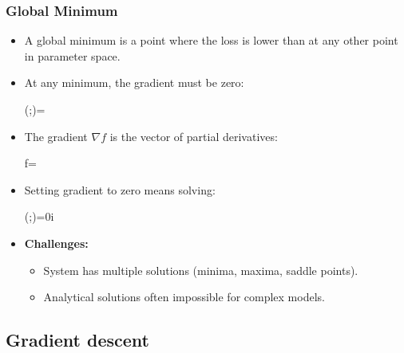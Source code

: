 \subsubsection*{Global Minimum}
\begin{itemize}
    \item A \alert{global minimum} is a point where the loss is lower than at any other point in parameter space.
    \item At any minimum, the gradient must be zero:
    \begin{myequation}
    \nabla{}(\Vtheta;)=\Zero
    \end{myequation}
    \item The gradient $\nabla f$ is the vector of partial derivatives:
    \begin{myequation}
    \nabla f=
    \end{myequation}
    \item Setting gradient to zero means solving:
    \begin{myequation}
    (\Vtheta;)=0\hspace{.5cm}\forall i
    \end{myequation}
    \item \textbf{Challenges:}
    \begin{itemize}
        \item System has multiple solutions (minima, maxima, saddle points).
        \item Analytical solutions often impossible for complex models.
    \end{itemize}
\end{itemize}

\subsection*{Gradient descent}

